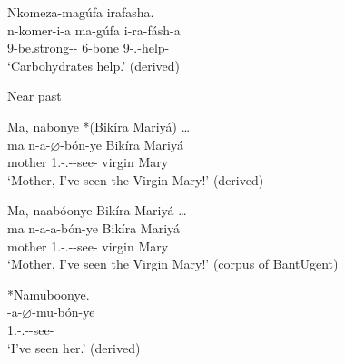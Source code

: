 \documentclass[output=paper]{langscibook}
\begin{document}
\ex
\begin{xlist}
\exi{\DJ{}}
Nkomeza-magúfa irafasha.\\
\gll
n-komer-i-a  ma-gúfa  i-ra-fásh-a  \\
9-be.strong-\CAUS{}-\FV{}  6-bone  9\SM-\PRS.\DJ{}-help-\FV{}\\
\glt
‘Carbohydrates help.’ (derived)\\

\end{xlist}
\z

\ex
Near past \citep[79,~80,~and~derived]{Nshemezimana2016}

\ea
\begin{xlist}
\exi{\CJ{}}
Ma, nabonye *(Bikíra Mariyá) …\\
\gll
ma  n-a-$\varnothing$-bón-ye  Bikíra  Mariyá\\
mother  1\SG.\SM-\N.\PST-\CJ{}-see-\PFV{}  virgin  Mary\\
\glt
‘Mother, I’ve seen the Virgin Mary!’ (derived)\\

\end{xlist}

\ex
\begin{xlist}
\exi{\DJ{}}
Ma, naabóonye Bikíra Mariyá …\\
\gll
ma  n-a-a-bón-ye  Bikíra  Mariyá\\
mother  1\SG.\SM{}-\N.\PST-\DJ{}-see-\PFV{}  virgin  Mary\\
\glt
‘Mother, I’ve seen the Virgin Mary!’ (corpus of BantUgent)\\

\end{xlist}

\ex
\begin{xlist}
\exi{\CJ{}}
*Namuboonye.\\
\gll
\N{}-a-$\varnothing$-mu-bón-ye\\
1\SG.\SM-\N.\PST-\OM{}-see-\PFV{}\\
\glt
‘I’ve seen her.’ (derived)\\

\end{xlist}
\end{document}
